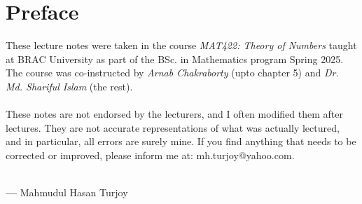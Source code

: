 \chapter*{Preface}
These lecture notes were taken in the course \textit{MAT422: Theory of Numbers} taught at BRAC University as part of the BSc. in Mathematics program Spring 2025. The course was co-instructed by \textit{Arnab Chakraborty} (upto chapter 5) and \textit{Dr. Md. Shariful Islam} (the rest).\\\\
These notes are not endorsed by the lecturers, and I often modified them after lectures. They are not accurate representations of what was actually lectured, and in particular, all errors are surely mine. If you find anything that needs to be corrected or improved, please inform me at: mh.turjoy@yahoo.com.\\\\
\begin{flushright}
    \textbf{---} Mahmudul Hasan Turjoy
\end{flushright}